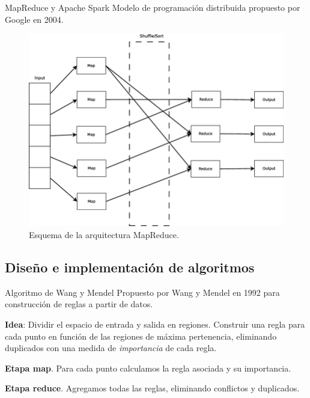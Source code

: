 \documentclass[10pt, spanish]{beamer}
\begin{document}
\begin{frame}{MapReduce y Apache Spark}
  Modelo de programación distribuida propuesto por Google en 2004.

  \begin{figure}
	\centering
	\includegraphics[width=.6\textwidth]{img/mapreduce}
	\caption{\footnotesize Esquema de la arquitectura MapReduce.}
\end{figure}
\end{frame}

\subsection{Diseño e implementación de algoritmos}



\begin{frame}{Algoritmo de Wang y Mendel}
  Propuesto por Wang y Mendel en 1992 para construcción de reglas a partir de datos.

  \textbf{Idea}: Dividir el espacio de entrada y salida en regiones. Construir una regla para cada punto en función de las regiones de máxima pertenencia, eliminando duplicados con una medida de \textit{importancia} de cada regla.


  \textbf{Etapa map}. Para cada punto calculamos la regla asociada y su importancia.

  \textbf{Etapa reduce}. Agregamos todas las reglas, eliminando conflictos y duplicados.

\end{frame}
\end{document}
